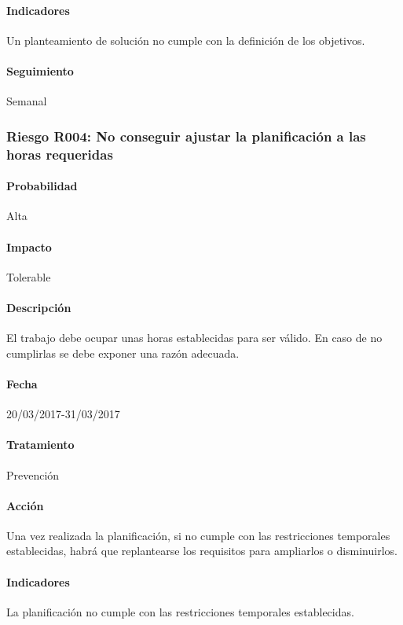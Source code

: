 \documentclass[10pt,a4paper]{article}
\begin{document}
				\paragraph{Indicadores} Un planteamiento de solución no cumple con la definición de los objetivos. %
				\paragraph{Seguimiento}	Semanal %
				
			\subsubsection{Riesgo R004: No conseguir ajustar la planificación a las horas requeridas }
				\paragraph{Probabilidad} Alta
				\paragraph{Impacto}	Tolerable
				\paragraph{Descripción} El trabajo debe ocupar unas horas establecidas para ser válido. En caso de no cumplirlas se debe exponer una razón adecuada.
				\paragraph{Fecha} 20/03/2017-31/03/2017
				\paragraph{Tratamiento} Prevención %
				\paragraph{Acción} Una vez realizada la planificación, si no cumple con las restricciones temporales establecidas, habrá que replantearse los requisitos para ampliarlos o disminuirlos.  %
				\paragraph{Indicadores} La planificación no cumple con las restricciones temporales establecidas. %
				
\end{document}
